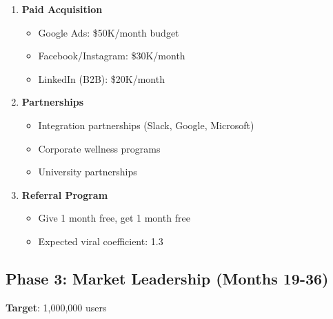 \begin{enumerate}
    \item \textbf{Paid Acquisition}
    \begin{itemize}
        \item Google Ads: \$50K/month budget
        \item Facebook/Instagram: \$30K/month
        \item LinkedIn (B2B): \$20K/month
    \end{itemize}
    
    \item \textbf{Partnerships}
    \begin{itemize}
        \item Integration partnerships (Slack, Google, Microsoft)
        \item Corporate wellness programs
        \item University partnerships
    \end{itemize}
    
    \item \textbf{Referral Program}
    \begin{itemize}
        \item Give 1 month free, get 1 month free
        \item Expected viral coefficient: 1.3
    \end{itemize}
\end{enumerate}

\subsection{Phase 3: Market Leadership (Months 19-36)}

\textbf{Target}: 1,000,000 users

